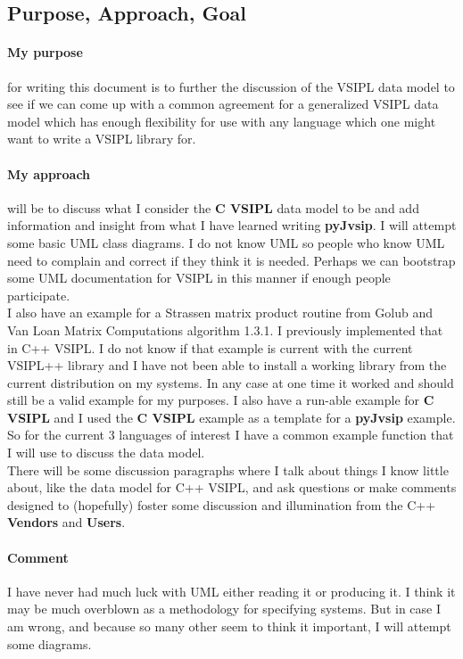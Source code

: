 \documentclass[11pt, oneside]{article}
\newcommand{\cvl}{\ttbf{C VSIPL}}
\newcommand{\pyjv}{{\ttbf{pyJvsip}}}
\newcommand{\ttbf}[1]{{\ttfamily \bfseries #1}}
\begin{document}
\subsection{Purpose, Approach, Goal}
\paragraph{My purpose} for writing this document is to further the discussion of the VSIPL data model to see if we can come up with a common agreement for a generalized VSIPL data model which has enough flexibility for use with any language which one might want to write a VSIPL library for.  
\paragraph{My approach} will be to discuss what I consider the \cvl{} data model to be and add information and insight from what I have learned writing \pyjv{}.  I will attempt some basic UML class diagrams.  I do not know UML so people who know UML need to complain and correct if they think it is needed. Perhaps we can bootstrap some UML documentation for VSIPL in this manner if enough people participate.
\\[6pt]
I also have an example for a Strassen matrix product routine from Golub and Van Loan Matrix Computations algorithm 1.3.1.  I previously implemented that in C++ VSIPL.  I do not know if that example is current with the current VSIPL++ library and I have not been able to install a working library from the current distribution on my systems.  In any case at one time it worked and should still be a valid example for my purposes.  I also have a run-able example for \cvl{} and I used the \cvl{} example as a template for a \pyjv{} example.  So for the current 3 languages of interest I have a common example function that I will use to discuss the data model.
\\[6pt]
There will be some discussion paragraphs where I talk about things I know little about, like the data model for C++ VSIPL, and ask questions or make comments designed to (hopefully) foster some discussion and illumination from the C++ \ttbf{Vendors} and \ttbf{Users}.
\paragraph{Comment}
I have never had much luck with UML either reading it or producing it. I think it may be much overblown as a methodology for specifying systems.  But in case I am wrong, and because so many other seem to think it important, I will attempt some diagrams.  
\end{document}
